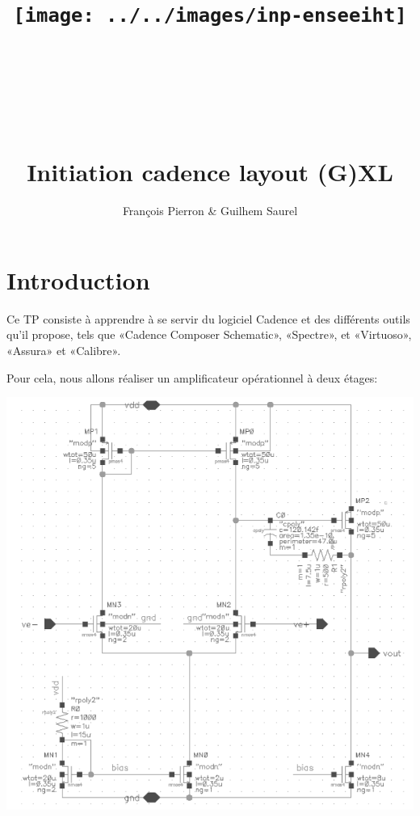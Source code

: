 \documentclass{article}
\title{\texttt{[image: ../../images/inp-enseeiht]} \\ ~ \\ ~ \\ ~ \\ ~ \\ Initiation cadence layout (G)XL}
\author{François Pierron \& Guilhem Saurel}
\date{\oldstylenums{24 janvier 2014}}
\begin{document}
\begin{titlepage}
    \setcounter{page}{0}
    \maketitle
    \vfill
    \tableofcontents
    \thispagestyle{empty}
\end{titlepage}


\section*{Introduction}

Ce TP consiste à apprendre à se servir du logiciel Cadence et des différents outils qu’il propose, tels que «Cadence Composer Schematic», «Spectre», et «Virtuoso», «Assura» et «Calibre».

Pour cela, nous allons réaliser un amplificateur opérationnel à deux étages:

\includegraphics[width=\linewidth]{sch.png}
\end{document}
